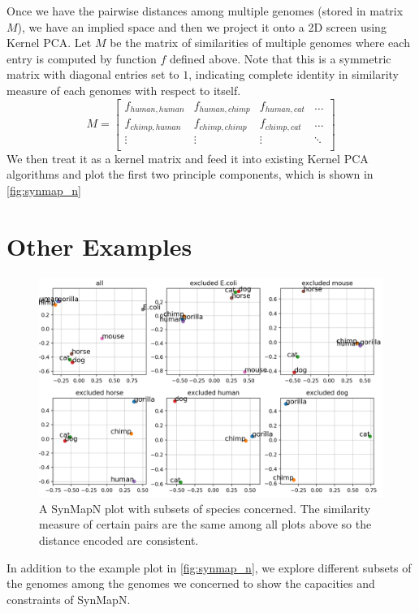 \documentclass{vgtc}                      %
\begin{document}
Once we have the pairwise distances among multiple genomes (stored in matrix $M$), we have an implied space and then we project it onto a 2D screen using Kernel PCA.
Let $M$ be the matrix of similarities of multiple genomes where each entry is computed by function $f$ defined above. Note that this is a symmetric matrix with diagonal entries set to $1$, indicating complete identity in similarity measure of each genomes with respect to itself.
$$M = 
\begin{bmatrix}
f_{human, human} & f_{human, chimp} & f_{human,cat} & \dots \\
f_{chimp, human} & f_{chimp, chimp} & f_{chimp, cat} & \dots \\
\vdots & \vdots & \vdots & \ddots \\
\end{bmatrix}
$$
We then treat it as a kernel matrix and feed it into existing Kernel PCA algorithms and plot the first two principle components, which is shown in \autoref{fig:synmap_n}
\section{Other Examples}

\begin{figure}[h]
 \centering
 \includegraphics[width=\columnwidth]{subset}
 \caption{A SynMapN plot with subsets of species concerned. The similarity measure of certain pairs are the same among all plots above so the distance encoded are consistent.}
 \label{fig:subset}
\end{figure}

In addition to the example plot in \autoref{fig:synmap_n}, we explore different subsets of the genomes among the genomes we concerned to show the capacities and constraints of SynMapN. 
\end{document}
